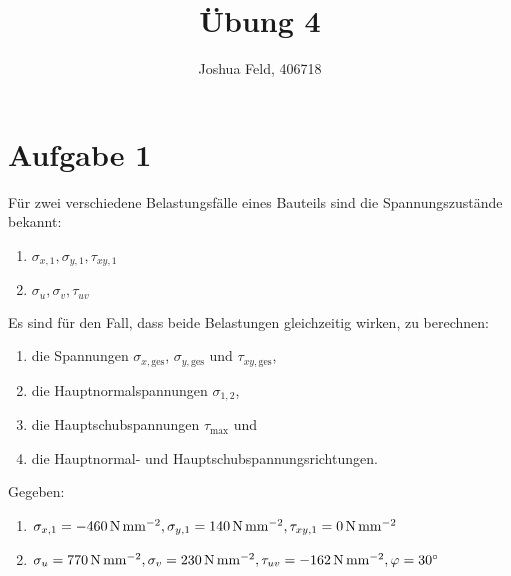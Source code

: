 \documentclass{exercise}
\institute{Lehr- und Forschungsgebiet Kontinuumsmechanik}
\title{Übung 4}
\author{Joshua Feld, 406718}
\begin{document}
    \maketitle


    \section*{Aufgabe 1}

    \begin{problem}
        Für zwei verschiedene Belastungsfälle eines Bauteils sind die Spannungszustände bekannt:
        \begin{enumerate}[label=(\roman*)]
            \item \(\sigma_{x, 1}, \sigma_{y, 1}, \tau_{xy, 1}\)
            \item \(\sigma_u, \sigma_v, \tau_{uv}\)
        \end{enumerate}
        Es sind für den Fall, dass beide Belastungen gleichzeitig wirken, zu berechnen:
        \begin{enumerate}
            \item die Spannungen \(\sigma_{x, \text{ges}}\), \(\sigma_{y, \text{ges}}\) und \(\tau_{xy, \text{ges}}\),
            \item die Hauptnormalspannungen \(\sigma_{1, 2}\),
            \item die Hauptschubspannungen \(\tau_{\text{max}}\) und
            \item die Hauptnormal- und Hauptschubspannungsrichtungen.
        \end{enumerate}
        Gegeben:
        \begin{enumerate}[label=(\roman*)]
            \item \(\sigma_{x, 1} = -460\,\si{\newton\per\milli\meter\squared}, \sigma_{y, 1} = 140\,\si{\newton\per\milli\meter\squared}, \tau_{xy, 1} = 0\,\si{\newton\per\milli\meter\squared}\)
            \item \(\sigma_u = 770\,\si{\newton\per\milli\meter\squared}, \sigma_v = 230\,\si{\newton\per\milli\meter\squared}, \tau_{uv} = -162\,\si{\newton\per\milli\meter\squared}, \varphi = 30^\circ\)
        \end{enumerate}
    \end{problem}
\end{document}

